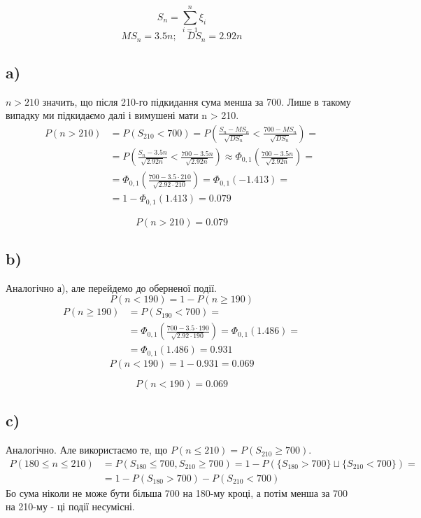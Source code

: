 \documentclass[11pt, a4paper]{article} %
\begin{document}
\[S_n = \sum_{i=1}^n \xi_i\]
\[MS_n = 3.5 n; \quad DS_n = 2.92 n\]

\subsection*{a)}
\(n > 210\) значить, що після 210-го підкидання сума менша за 700. Лише в такому випадку ми підкидаємо далі і вимушені мати n > 210.
\begin{align*}
    P(n > 210) &= P(S_{210} < 700) = P\left(\frac{S_n - MS_n}{\sqrt{DS_n}} < \frac{700 - MS_n}{\sqrt{DS_n}}\right) = \\
    &= P\left(\frac{S_n - 3.5 n}{\sqrt{2.92 n}} < \frac{700 - 3.5 n}{\sqrt{2.92 n}}\right) \approx \Phi_{0,1}\left(\frac{700 - 3.5 n}{\sqrt{2.92 n}}\right) = \\
    &= \Phi_{0,1}\left(\frac{700 - 3.5 \cdot 210}{\sqrt{2.92 \cdot 210}}\right) = \Phi_{0,1}(-1.413) = \\
    &= 1 - \Phi_{0,1}(1.413) = 0.079
\end{align*}
\begin{mdframed}[style=ans]
    \[P(n > 210) = 0.079\]
\end{mdframed}

\subsection*{b)}
Аналогічно а), але перейдемо до оберненої події.
$$P(n < 190) = 1 - P(n \ge 190)$$
\begin{align*}
    P(n \ge 190) &= P(S_{190} < 700) = \\
    &= \Phi_{0,1}\left(\frac{700 - 3.5 \cdot 190}{\sqrt{2.92 \cdot 190}}\right) = \Phi_{0,1}(1.486) = \\
    &= \Phi_{0,1}(1.486) = 0.931
\end{align*}
$$P(n < 190) = 1 - 0.931 = 0.069$$

\begin{mdframed}[style=ans]
    \[P(n < 190) = 0.069\]
\end{mdframed}

\subsection*{c)}
Аналогічно. Але використаємо те, що $P(n\le 210) = P(S_{210} \ge 700)$.
\begin{align*}
    P(180 \le n \le 210) &= P(S_{180}\le 700, S_{210}\ge 700) = 1 - P(\{S_{180}> 700\} \sqcup \{S_{210}< 700\}) = \\
    &= 1 - P(S_{180} > 700) - P(S_{210} < 700)
\end{align*}
Бо сума ніколи не може бути більша 700 на 180-му кроці, а потім менша за 700 на 210-му - ці події несумісні.
\end{document}
